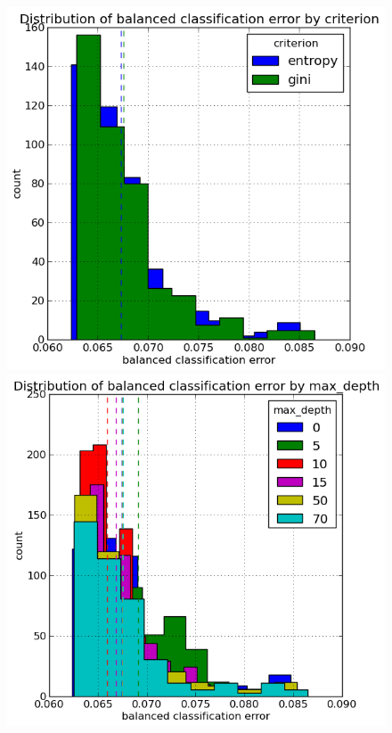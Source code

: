 \documentclass[final,3p,times,twocolumn]{elsarticle}
\begin{document}
\begin{figure}
\includegraphics[scale=0.5]{Images/balanced_classification_error_criterion.png}
\includegraphics[scale=0.5]{Images/balanced_classification_error_max_depth.png}

\end{figure}
\end{document}
